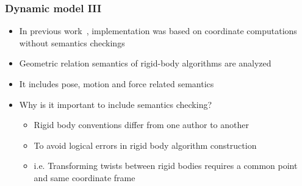 \documentclass{beamer}
\begin{document}
\begin{frame}
	\frametitle{Dynamic model III}
	\vspace{-0.5cm}
	\begin{itemize}
	\item In previous work~\cite{p7}, implementation was based on coordinate computations without semantics checkings
	\item Geometric relation semantics of rigid-body algorithms are analyzed
	\item It includes pose, motion and force related semantics
	\item Why is it important to include semantics checking?
	\begin{itemize}
	\item Rigid body conventions differ from one author to another
	\item To avoid logical errors in rigid body algorithm construction
	\item i.e. Transforming twists between rigid bodies requires a common point and same coordinate frame
	\end{itemize}
	\end{itemize}
\end{frame}
\end{document}
